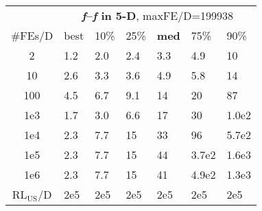 \begin{tabular}{c|llllll}
 & \multicolumn{6}{|c}{\textbf{\textit{f}\raisebox{-0.35ex}{1}--\textit{f}\raisebox{-0.35ex}{24} in 5-D}, maxFE/D=199938}\\
\#FEs/D & best & 10\% & 25\% & \textbf{med} & 75\% & 90\%\\
2 & \hspace*{1ex}1.2 & \hspace*{1ex}2.0 & \hspace*{1ex}2.4 & \hspace*{1ex}3.3 & \hspace*{1ex}4.9 & 10\\
10 & \hspace*{1ex}2.6 & \hspace*{1ex}3.3 & \hspace*{1ex}3.6 & \hspace*{1ex}4.9 & \hspace*{1ex}5.8 & 14\\
100 & \hspace*{1ex}4.5 & \hspace*{1ex}6.7 & \hspace*{1ex}9.1 & 14 & 20 & 87\\
1e3 & \hspace*{1ex}1.7 & \hspace*{1ex}3.0 & \hspace*{1ex}6.6 & 17 & 30 & 1.0e2\\
1e4 & \hspace*{1ex}2.3 & \hspace*{1ex}7.7 & 15 & 33 & 96 & 5.7e2\\
1e5 & \hspace*{1ex}2.3 & \hspace*{1ex}7.7 & 15 & 44 & 3.7e2 & 1.6e3\\
1e6 & \hspace*{1ex}2.3 & \hspace*{1ex}7.7 & 15 & 41 & 4.9e2 & 1.3e3\\
$\text{RL}_{\text{US}}$/D & 2e5 & 2e5 & 2e5 & 2e5 & 2e5 & 2e5
\end{tabular}

